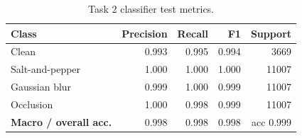 \begin{table}[t]
\centering
\caption{Task 2 classifier test metrics.}
\label{tab:t2_cls}
\footnotesize
\begin{tabular}{lrrrr}
\toprule
Class & Precision & Recall & F1 & Support \\
\midrule
Clean & 0.993 & 0.995 & 0.994 & 3669 \\
Salt-and-pepper & 1.000 & 1.000 & 1.000 & 11007 \\
Gaussian blur & 0.999 & 1.000 & 0.999 & 11007 \\
Occlusion & 1.000 & 0.998 & 0.999 & 11007 \\
\textbf{Macro / overall acc.} & 0.998 & 0.998 & 0.998 & acc 0.999 \\
\bottomrule
\end{tabular}
\end{table}
